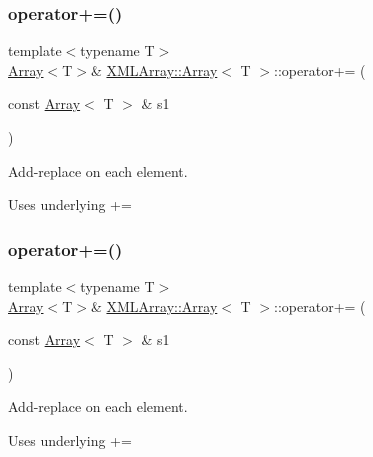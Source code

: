 \subsubsection{\texorpdfstring{operator+=()}{operator+=()}\hspace{0.1cm}{\footnotesize\ttfamily [2/6]}}
{\footnotesize\ttfamily template$<$typename T$>$ \\
\mbox{\hyperlink{classXMLArray_1_1Array}{Array}}$<$T$>$\& \mbox{\hyperlink{classXMLArray_1_1Array}{X\+M\+L\+Array\+::\+Array}}$<$ T $>$\+::operator+= (\begin{DoxyParamCaption}\item[{const \mbox{\hyperlink{classXMLArray_1_1Array}{Array}}$<$ T $>$ \&}]{s1 }\end{DoxyParamCaption})\hspace{0.3cm}{\ttfamily [inline]}}



Add-\/replace on each element. 

Uses underlying += \mbox{\label{classXMLArray_1_1Array_ab8a6046aa7dbc0b3c43e4479b1eaf004}} 
\subsubsection{\texorpdfstring{operator+=()}{operator+=()}\hspace{0.1cm}{\footnotesize\ttfamily [3/6]}}
{\footnotesize\ttfamily template$<$typename T$>$ \\
\mbox{\hyperlink{classXMLArray_1_1Array}{Array}}$<$T$>$\& \mbox{\hyperlink{classXMLArray_1_1Array}{X\+M\+L\+Array\+::\+Array}}$<$ T $>$\+::operator+= (\begin{DoxyParamCaption}\item[{const \mbox{\hyperlink{classXMLArray_1_1Array}{Array}}$<$ T $>$ \&}]{s1 }\end{DoxyParamCaption})\hspace{0.3cm}{\ttfamily [inline]}}



Add-\/replace on each element. 

Uses underlying += \mbox{\label{classXMLArray_1_1Array_ad3487cb84f2a45cc24ed06f5e96a62ee}} 
